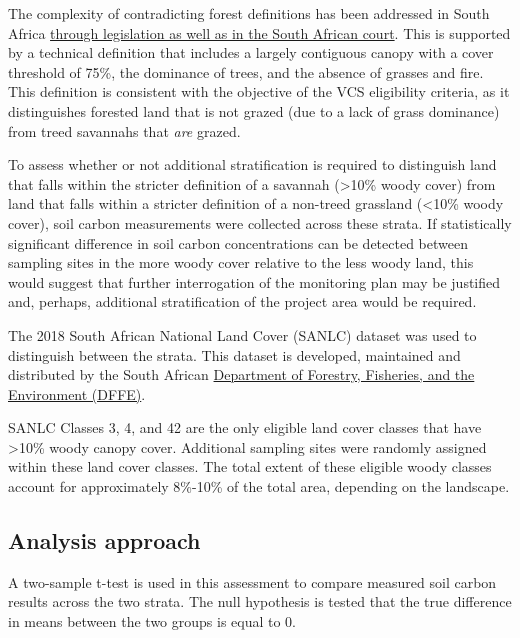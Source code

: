 \documentclass[
  letterpaper,
  DIV=11,
  numbers=noendperiod]{scrartcl}
\begin{document}
The complexity of contradicting forest definitions has been addressed in
South Africa
\href{https://www.dffe.gov.za/sites/default/files/legislations/policyandguidelines_controlofdevelopmentaffecting_naturalforests.pdf}{through
legislation as well as in the South African court}. This is supported by
a technical definition that includes a largely contiguous canopy with a
cover threshold of 75\%, the dominance of trees, and the absence of
grasses and fire. This definition is consistent with the objective of
the VCS eligibility criteria, as it distinguishes forested land that is
not grazed (due to a lack of grass dominance) from treed savannahs that
\emph{are} grazed.

To assess whether or not additional stratification is required to
distinguish land that falls within the stricter definition of a savannah
(\textgreater10\% woody cover) from land that falls within a stricter
definition of a non-treed grassland (\textless10\% woody cover), soil
carbon measurements were collected across these strata. If statistically
significant difference in soil carbon concentrations can be detected
between sampling sites in the more woody cover relative to the less
woody land, this would suggest that further interrogation of the
monitoring plan may be justified and, perhaps, additional stratification
of the project area would be required.

The 2018 South African National Land Cover (SANLC) dataset was used to
distinguish between the strata. This dataset is developed, maintained
and distributed by the South African
\href{https://egis.environment.gov.za/\%20sa_national_land_cover_datasets}{Department
of Forestry, Fisheries, and the Environment (DFFE)}.

SANLC Classes 3, 4, and 42 are the only eligible land cover classes that
have \textgreater10\% woody canopy cover. Additional sampling sites were
randomly assigned within these land cover classes. The total extent of
these eligible woody classes account for approximately 8\%-10\% of the
total area, depending on the landscape.

\subsection{Analysis approach}\label{analysis-approach}

A two-sample t-test is used in this assessment to compare measured soil
carbon results across the two strata. The null hypothesis is tested that
the true difference in means between the two groups is equal to 0.
\end{document}
